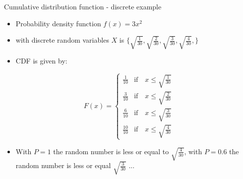\begin{slide}[toc=CDF discrete]{Cumulative distribution function - discrete example}
\null\vfill

  \begin{itemize}
    
    \item Probability density function $f(x) = 3x^2$
    \item[] with discrete random variables $X$ is $\{\sqrt{\frac{1}{30}}, \sqrt{\frac{2}{30}}, \sqrt{\frac{3}{30}}, \sqrt{\frac{4}{30}},\}$
    \item CDF is given by:
    
  \end{itemize}
  
  \twocolumn
  {
  $$F (x) = \begin{cases}
	      \frac{1}{10}  & \mbox{if~~~} x \leq \sqrt{\frac{1}{30}} \\
	      \frac{3}{10}  & \mbox{if~~~} x \leq \sqrt{\frac{2}{30}} \\
	      \frac{6}{10}  & \mbox{if~~~} x \leq \sqrt{\frac{3}{30}} \\
	      \frac{10}{10} & \mbox{if~~~} x \leq \sqrt{\frac{4}{30}} 
	    \end{cases}
  $$
  }
  {
    
  }
  \vspace{-10pt}
  \begin{itemize}
  
    \item With $P = 1$ the random number is less or equal to $\sqrt{\frac{4}{30}}$, with $P = 0.6$ the random number is less or equal $\sqrt{\frac{3}{30}}$ ...
    
  \end{itemize}

\vfill\null
\end{slide}

